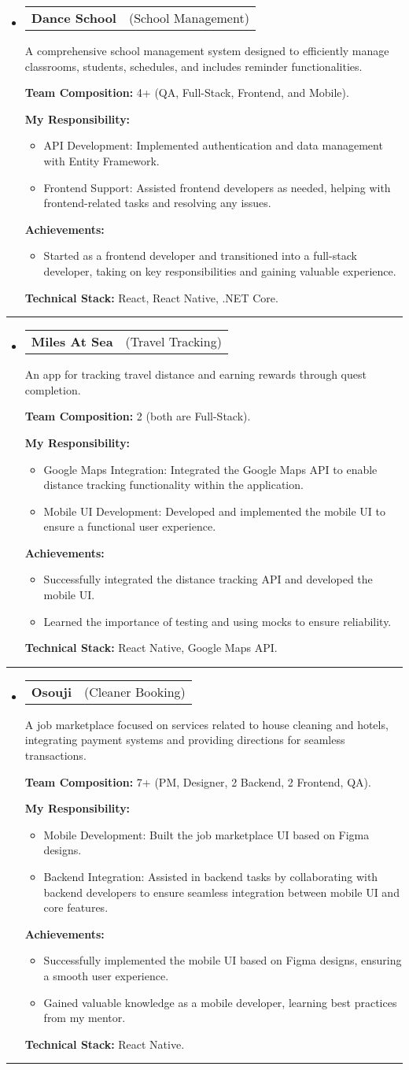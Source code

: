 \documentclass[letterpaper,11pt]{article}
\makeatletter
\newcommand{\resumeProjectTitle}[2]{
  \vspace{-2pt}\item
    \begin{tabular*}{1\textwidth}[t]{l @{\hskip 2pt} r}
      \textbf{#1} & \small #2 \\
    \end{tabular*}\vspace{2pt}
}
\newcommand{\resumeDesc}[1]{
  {#1\\ \vspace{0px}}
}
\newcommand{\resumeItem}[1]{
  \item{#1 \vspace{-2pt}}
}
\newcommand{\resumeItemListTitle}[1]{%
  \vspace{4pt} \textbf{#1} \vspace{-2pt}%
}
\newcommand{\resumeItemListStart}{\vspace{-4pt}\begin{itemize}[leftmargin=12px]}
\newcommand{\resumeItemListEnd}{\end{itemize}\vspace{-5pt}}
\newcommand{\resumeSubHeadingListStart}{\begin{itemize}[leftmargin=0pt, label={}]}
\newcommand{\resumeSubHeadingListEnd}{\end{itemize}\vspace{-5pt}}
\makeatother
\begin{document}
\resumeSubHeadingListStart
\resumeProjectTitle{Dance School}{(School Management)}
\resumeDesc{A comprehensive school management system designed to efficiently manage classrooms, students, schedules, and includes reminder functionalities.}
\resumeItemListTitle{Team Composition:} 4+ (QA, Full-Stack, Frontend, and Mobile).
\par
\resumeItemListTitle{My Responsibility:}
\resumeItemListStart
    \resumeItem{API Development: Implemented authentication and data management with Entity Framework.}
    \resumeItem{Frontend Support: Assisted frontend developers as needed, helping with frontend-related tasks and resolving any issues.}
\resumeItemListEnd
\resumeItemListTitle{Achievements:}
\resumeItemListStart
    \resumeItem{Started as a frontend developer and transitioned into a full-stack developer, taking on key responsibilities and gaining valuable experience.}
\resumeItemListEnd
\resumeItemListTitle{Technical Stack:} React, React Native, .NET Core.
\resumeSubHeadingListEnd
\noindent\rule{\textwidth}{0.4pt}

\resumeSubHeadingListStart
\resumeProjectTitle{Miles At Sea}{(Travel Tracking)}
\resumeDesc{An app for tracking travel distance and earning rewards through quest completion.}
\resumeItemListTitle{Team Composition:} 2 (both are Full-Stack).
\par
\resumeItemListTitle{My Responsibility:}
\resumeItemListStart
    \resumeItem{Google Maps Integration: Integrated the Google Maps API to enable distance tracking functionality within the application.}
    \resumeItem{Mobile UI Development: Developed and implemented the mobile UI to ensure a functional user experience.}
\resumeItemListEnd
\resumeItemListTitle{Achievements:}
\resumeItemListStart
    \resumeItem{Successfully integrated the distance tracking API and developed the mobile UI.}
    \resumeItem{Learned the importance of testing and using mocks to ensure reliability.}
\resumeItemListEnd
\resumeItemListTitle{Technical Stack:} React Native, Google Maps API.
\resumeSubHeadingListEnd
\noindent\rule{\textwidth}{0.4pt}

\resumeSubHeadingListStart
\resumeProjectTitle{Osouji}{(Cleaner Booking)}
\resumeDesc{A job marketplace focused on services related to house cleaning and hotels, integrating payment systems and providing directions for seamless transactions.}
\resumeItemListTitle{Team Composition:} 7+ (PM, Designer, 2 Backend, 2 Frontend, QA).
\par
\resumeItemListTitle{My Responsibility:}
\resumeItemListStart
    \resumeItem{Mobile Development: Built the job marketplace UI based on Figma designs.}
    \resumeItem{Backend Integration: Assisted in backend tasks by collaborating with backend developers to ensure seamless integration between mobile UI and core features.}
\resumeItemListEnd
\resumeItemListTitle{Achievements:}
\resumeItemListStart
    \resumeItem{Successfully implemented the mobile UI based on Figma designs, ensuring a smooth user experience.}
    \resumeItem{Gained valuable knowledge as a mobile developer, learning best practices from my mentor.}
\resumeItemListEnd
\resumeItemListTitle{Technical Stack:} React Native.
\resumeSubHeadingListEnd
\noindent\rule{\textwidth}{0.4pt}
\end{document}
